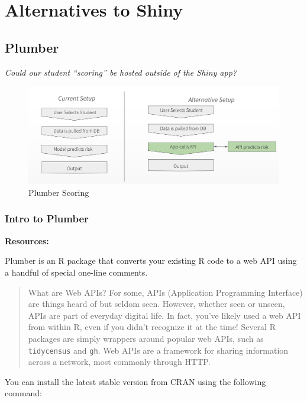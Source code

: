 \documentclass[]{book}
\theoremstyle{definition}
\theoremstyle{definition}
\theoremstyle{definition}
\theoremstyle{remark}
\begin{document}
\hypertarget{alternatives-to-shiny}{%
\chapter{Alternatives to Shiny}\label{alternatives-to-shiny}}

\hypertarget{plumber}{%
\section{Plumber}\label{plumber}}

\emph{Could our student ``scoring'' be hosted outside of the Shiny app?}

\begin{figure}
\centering
\includegraphics{imgs/shiny-alt/plumber-alt.png}
\caption{Plumber Scoring}
\end{figure}

\hypertarget{intro-to-plumber}{%
\subsection{Intro to Plumber}\label{intro-to-plumber}}

\textbf{Resources:}

Plumber is an R package that converts your existing R code to a web API
using a handful of special one-line comments.

\begin{quote}
What are Web APIs? For some, APIs (Application Programming Interface)
are things heard of but seldom seen. However, whether seen or unseen,
APIs are part of everyday digital life. In fact, you've likely used a
web API from within R, even if you didn't recognize it at the time!
Several R packages are simply wrappers around popular web APIs, such as
\texttt{tidycensus} and \texttt{gh}. Web APIs are a framework for
sharing information across a network, most commonly through HTTP.
\end{quote}

You can install the latest stable version from CRAN using the following
command:
\end{document}
